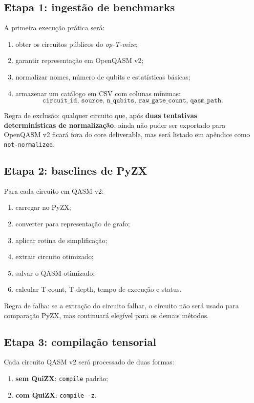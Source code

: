 \documentclass[a4paper,11pt]{article}
\begin{document}
\subsection*{Etapa 1: ingestão de benchmarks}

A primeira execução prática será:
\begin{enumerate}
  \item obter os circuitos públicos do \textit{op-T-mize};
  \item garantir representação em OpenQASM v2;
  \item normalizar nomes, número de qubits e estatísticas básicas;
  \item armazenar um catálogo em CSV com colunas mínimas:
  \[
  \texttt{circuit\_id, source, n\_qubits, raw\_gate\_count, qasm\_path.}
  \]
\end{enumerate}

Regra de exclusão: qualquer circuito que, após \textbf{duas tentativas determinísticas de normalização}, ainda não puder ser exportado para OpenQASM v2 ficará fora do core deliverable, mas será listado em apêndice como \texttt{not-normalized}.

\subsection*{Etapa 2: baselines de PyZX}

Para cada circuito em QASM v2:
\begin{enumerate}
  \item carregar no PyZX;
  \item converter para representação de grafo;
  \item aplicar rotina de simplificação;
  \item extrair circuito otimizado;
  \item salvar o QASM otimizado;
  \item calcular T-count, T-depth, tempo de execução e status.
\end{enumerate}

Regra de falha: se a extração do circuito falhar, o circuito não será usado para comparação PyZX, mas continuará elegível para os demais métodos.

\subsection*{Etapa 3: compilação tensorial}

Cada circuito QASM v2 será processado de duas formas:
\begin{enumerate}
  \item \textbf{sem QuiZX}: \texttt{compile} padrão;
  \item \textbf{com QuiZX}: \texttt{compile -z}.
\end{enumerate}
\end{document}
